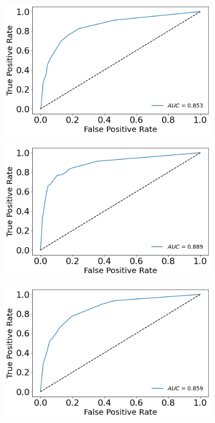 \documentclass[a4paper,11pt,dvipsnames]{article}
\begin{document}
\begin{figure}[h]
\centering
\begin{minipage}[b]{.3\linewidth}
\centering\large \includegraphics[width=0.8\linewidth]{arousal_ROC.png}
\label{fig:arroc}
\end{minipage}%
    \hfil
\begin{minipage}[b]{.3\linewidth}
\centering\includegraphics[width=0.8\linewidth]{valence_ROC.png}\label{fig:valroc}
\end{minipage}    \hfil
\begin{minipage}[b]{.3\linewidth}
\centering\includegraphics[width=0.8\linewidth]{dominance_ROC.png}\label{fig:domroc}
\end{minipage}


\end{figure}
\end{document}
